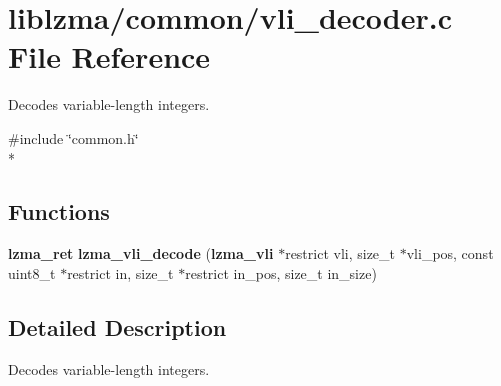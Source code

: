 \section{liblzma/common/vli\-\_\-decoder.c File Reference}
\label{vli__decoder_8c}


Decodes variable-\/length integers.  


{\ttfamily \#include \char`\"{}common.\-h\char`\"{}}\\*
\subsection*{Functions}
\begin{DoxyCompactItemize}
\item 
{\bf lzma\-\_\-ret} {\bfseries lzma\-\_\-vli\-\_\-decode} ({\bf lzma\-\_\-vli} $\ast$restrict vli, size\-\_\-t $\ast$vli\-\_\-pos, const uint8\-\_\-t $\ast$restrict in, size\-\_\-t $\ast$restrict in\-\_\-pos, size\-\_\-t in\-\_\-size)\label{vli__decoder_8c_aba209ec14273c2c05697bd76529b6969}

\end{DoxyCompactItemize}


\subsection{Detailed Description}
Decodes variable-\/length integers. 